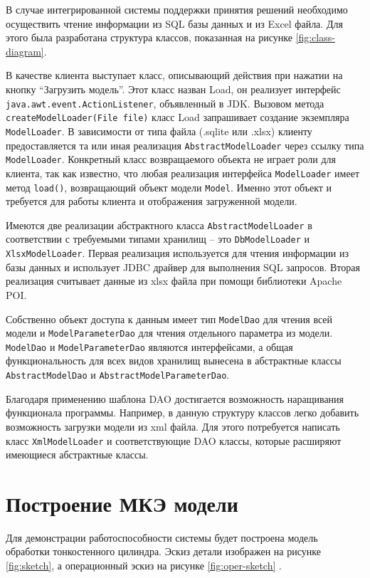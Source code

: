 \documentclass[14pt,oneside,final]{extreport}
\begin{document}
	
	В случае интегрированной системы поддержки принятия решений необходимо осуществить чтение информации из SQL базы данных и из Excel файла. Для этого была разработана структура классов, показанная на рисунке \ref{fig:class-diagram}.
	
	В качестве клиента выступает класс, описывающий действия при нажатии на кнопку ``Загрузить модель''. Этот класс назван Load, он реализует интерфейс \texttt{java.awt.event.ActionListener}, объявленный в JDK. Вызовом метода \texttt{createModelLoader(File file)} класс Load запрашивает создание экземпляра \texttt{ModelLoader}. В зависимости от типа файла (.sqlite или .xlsx) клиенту предоставляется та или иная реализация \texttt{AbstractModelLoader} через ссылку типа \texttt{ModelLoader}. Конкретный класс возвращаемого объекта не играет роли для клиента, так как известно, что любая реализация интерфейса \texttt{ModelLoader} имеет метод \texttt{load()}, возвращающий объект модели \texttt{Model}. Именно этот объект и требуется для работы клиента и отображения загруженной модели. 
	
	Имеются две реализации абстрактного класса \texttt{AbstractModelLoader} в соответствии с требуемыми типами хранилищ -- это \texttt{DbModelLoader} и \texttt{XlsxModelLoader}. Первая реализация используется для чтения информации из базы данных и использует JDBC драйвер для выполнения SQL запросов. Вторая реализация считывает данные из xlsx файла при помощи библиотеки Apache POI. 
	
	Собственно объект доступа к данным имеет тип \texttt{ModelDao} для чтения всей модели и \texttt{ModelParameterDao} для чтения отдельного параметра из модели. \texttt{ModelDao} и \texttt{ModelParameterDao} являются интерфейсами, а общая функциональность для всех видов хранилищ вынесена в абстрактные классы \texttt{AbstractModelDao} и \texttt{AbstractModelParameterDao}.  
	
	Благодаря применению шаблона DAO достигается возможность наращивания функционала программы. Например, в данную структуру классов легко добавить возможность загрузки модели из xml файла. Для этого потребуется написать класс \texttt{XmlModelLoader} и соответствующие DAO классы, которые расширяют имеющиеся абстрактные классы. 
	
	\section{Построение МКЭ модели}
	Для демонстрации работоспособности системы будет построена модель обработки тонкостенного цилиндра.  Эскиз детали изображен на рисунке \ref{fig:sketch}, а операционный эскиз на рисунке \ref{fig:oper-sketch} .
	
\end{document}
